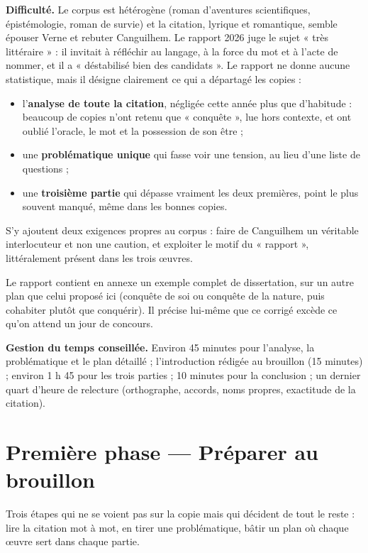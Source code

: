 \documentclass[11pt,a4paper]{article}
\providecommand{\tightlist}{\setlength{\itemsep}{0pt}\setlength{\parskip}{0pt}}
\begin{document}
\textbf{Difficulté.} Le corpus est hétérogène (roman d'aventures scientifiques, épistémologie, roman de survie) et la citation, lyrique et romantique, semble épouser Verne et rebuter Canguilhem. Le rapport 2026 juge le sujet « très littéraire » : il invitait à réfléchir au langage, à la force du mot et à l'acte de nommer, et il a « déstabilisé bien des candidats ». Le rapport ne donne aucune statistique, mais il désigne clairement ce qui a départagé les copies :

\begin{itemize}
\tightlist
\item
  l'\textbf{analyse de toute la citation}, négligée cette année plus que d'habitude : beaucoup de copies n'ont retenu que « conquête », lue hors contexte, et ont oublié l'oracle, le mot et la possession de son être ;
\item
  une \textbf{problématique unique} qui fasse voir une tension, au lieu d'une liste de questions ;
\item
  une \textbf{troisième partie} qui dépasse vraiment les deux premières, point le plus souvent manqué, même dans les bonnes copies.
\end{itemize}

S'y ajoutent deux exigences propres au corpus : faire de Canguilhem un véritable interlocuteur et non une caution, et exploiter le motif du « rapport », littéralement présent dans les trois œuvres.

Le rapport contient en annexe un exemple complet de dissertation, sur un autre plan que celui proposé ici (conquête de soi ou conquête de la nature, puis cohabiter plutôt que conquérir). Il précise lui-même que ce corrigé excède ce qu'on attend un jour de concours.

\textbf{Gestion du temps conseillée.} Environ 45 minutes pour l'analyse, la problématique et le plan détaillé ; l'introduction rédigée au brouillon (15 minutes) ; environ 1 h 45 pour les trois parties ; 10 minutes pour la conclusion ; un dernier quart d'heure de relecture (orthographe, accords, noms propres, exactitude de la citation).

\hypertarget{premiuxe8re-phase-pruxe9parer-au-brouillon}{%
\section{Première phase --- Préparer au brouillon}\label{premiuxe8re-phase-pruxe9parer-au-brouillon}}

Trois étapes qui ne se voient pas sur la copie mais qui décident de tout le reste : lire la citation mot à mot, en tirer une problématique, bâtir un plan où chaque œuvre sert dans chaque partie.
\end{document}
